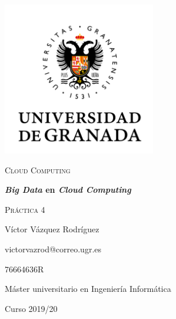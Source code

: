 \documentclass{article}
\begin{document}
\begin{titlepage}
    \centering
    \includegraphics[width=0.5\textwidth]{images/logo-ugr.png}\par
    \vspace{1cm}
    {\Large\scshape Cloud Computing \par}
    {\huge\bfseries \textit{Big Data} en \textit{Cloud Computing} \par}
    \vspace{0.2cm}
    {\scshape Práctica 4 \par}
    \vfill
    {\large Víctor Vázquez Rodríguez  \par}
    {victorvazrod@correo.ugr.es \par}
    {76664636R \par}
    \vfill
    {\large Máster universitario en Ingeniería Informática \par}
    \vspace{0.2cm}
    {Curso 2019/20 \par}
\end{titlepage}

\tableofcontents\newpage

\newpage
\newpage
\newpage
\newpage
\newpage
\end{document}
